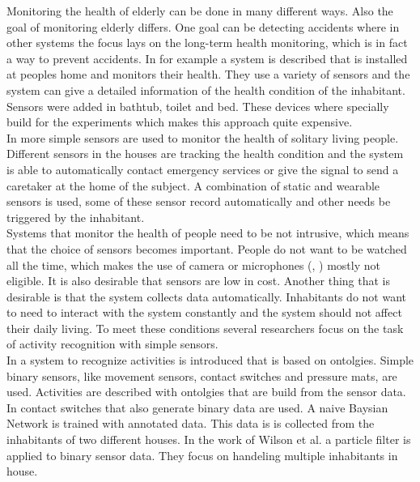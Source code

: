\documentclass[11pt,a4paper]{article}
\begin{document}
Monitoring the health of elderly can be done in many different ways. Also the goal of monitoring elderly differs. One goal can be detecting accidents where in other systems the focus lays on the long-term health monitoring, which is in fact a way to prevent accidents. In \cite{Tamura1998573} for example a system is described that is installed at peoples home and monitors their health. They use a variety of sensors and the system can give a detailed information of the health condition of the inhabitant. Sensors were added in bathtub, toilet and bed. These devices where specially build for the experiments which makes this approach quite expensive.\\
In \cite{Kwon20125774} more simple sensors are used to monitor the health of solitary living people. Different sensors in the houses are tracking the health condition and the system is able to automatically contact emergency services or give the signal to send a caretaker at the home of the subject. A combination of static and wearable sensors is used, some of these sensor record automatically and other needs be triggered by the inhabitant.\\
Systems that monitor the health of people need to be not intrusive, which means that the choice of sensors becomes important. People do not want to be watched all the time, which makes the use of camera or microphones (\cite{Nagai2010204}, \cite{Wu_2003_4676}) mostly not eligible.
It is also desirable that sensors are low in cost. Another thing that is desirable is that the system collects data automatically. Inhabitants do not want to need to interact with the system constantly and the system should not affect their daily living. To meet these conditions several researchers focus on the task of activity recognition with simple sensors.\\

In \cite{Hong2009236} a system to recognize activities is introduced that is based on ontolgies. Simple binary sensors, like movement sensors, contact switches and pressure mats, are used. Activities are described with ontolgies that are build from the sensor data.
In \cite{Tapia04activityrecognition} contact switches that also generate binary data are used. A naive Baysian Network is trained with annotated data. This data is is collected from the inhabitants of two different houses.
In the work of Wilson et al. \cite{Wilson:2005:STA:2154273.2154280} a particle filter is applied to binary sensor data. They focus on handeling multiple inhabitants in house.\\
\end{document}
